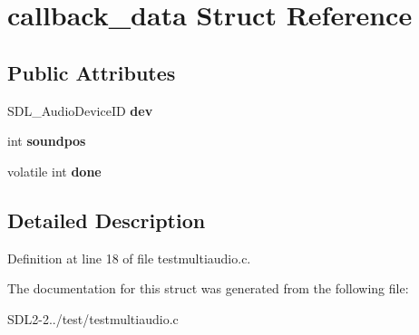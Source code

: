 \hypertarget{structcallback__data}{\section{callback\+\_\+data Struct Reference}
\label{structcallback__data}
}
\subsection*{Public Attributes}
\begin{DoxyCompactItemize}
\item 
\hypertarget{structcallback__data_a0ec01c0f106fec7cf3a13bad82a66477}{S\+D\+L\+\_\+\+Audio\+Device\+I\+D {\bfseries dev}}\label{structcallback__data_a0ec01c0f106fec7cf3a13bad82a66477}

\item 
\hypertarget{structcallback__data_af7c90671e8854e6c5fbe4695937aebcb}{int {\bfseries soundpos}}\label{structcallback__data_af7c90671e8854e6c5fbe4695937aebcb}

\item 
\hypertarget{structcallback__data_a2133a805fa1a2e9b2207aca9830805c6}{volatile int {\bfseries done}}\label{structcallback__data_a2133a805fa1a2e9b2207aca9830805c6}

\end{DoxyCompactItemize}


\subsection{Detailed Description}


Definition at line 18 of file testmultiaudio.\+c.



The documentation for this struct was generated from the following file\+:\begin{DoxyCompactItemize}
\item 
S\+D\+L2-\/2../test/testmultiaudio.\+c\end{DoxyCompactItemize}
